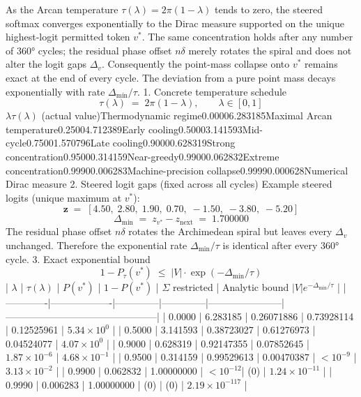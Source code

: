 As the Arcan temperature \(\tau(\lambda)=2\pi(1-\lambda)\) tends to zero, the steered softmax converges exponentially to the Dirac measure supported on the unique highest-logit permitted token \(v^*\). The same concentration holds after any number of 360° cycles; the residual phase offset \(n\delta\) merely rotates the spiral and does not alter the logit gaps \(\Delta_v\). Consequently the point-mass collapse onto \(v^*\) remains exact at the end of every cycle. The deviation from a pure point mass decays exponentially with rate \(\Delta_{\min}/\tau\).
1. Concrete temperature schedule
\[
\tau(\lambda)\;=\;2\pi(1-\lambda),\qquad\lambda\in[0,1]
\]\(\lambda\)\(\tau(\lambda)\) (actual value)Thermodynamic regime0.00006.283185Maximal Arcan temperature0.25004.712389Early cooling0.50003.141593Mid-cycle0.75001.570796Late cooling0.90000.628319Strong concentration0.95000.314159Near-greedy0.99000.062832Extreme concentration0.99900.006283Machine-precision collapse0.99990.000628Numerical Dirac measure
2. Steered logit gaps (fixed across all cycles)
Example steered logits (unique maximum at \(v^*\)):
\[
\mathbf{z}\;=\;[4.50,\;2.80,\;1.90,\;0.70,\;-1.50,\;-3.80,\;-5.20]
\]\[
\Delta_{\min}\;=\;z_{v^*}-z_{\text{next}}\;=\;1.700000
\]
The residual phase offset \(n\delta\) rotates the Archimedean spiral but leaves every \(\Delta_v\) unchanged. Therefore the exponential rate \(\Delta_{\min}/\tau\) is identical after every 360° cycle.
3. Exact exponential bound
\[
1-P_\tau(v^*)\;\le\;|V|\cdot\exp(-\Delta_{\min}/\tau)
\]
| \(\lambda\) | \(\tau(\lambda)\) | \(P(v^*)\)   | \(1-P(v^*)\) | \(\Sigma\) restricted | Analytic bound \(|V|e^{-\Delta_{\min}/\tau}\) |
|-------------|-------------------|--------------|--------------|-----------------------|-----------------------------------------------|
| 0.0000      | 6.283185          | 0.26071886   | 0.73928114   | 0.12525961            | \(5.34\times10^{0}\)                          |
| 0.5000      | 3.141593          | 0.38723027   | 0.61276973   | 0.04524077            | \(4.07\times10^{0}\)                          |
| 0.9000      | 0.628319          | 0.92147355   | 0.07852645   | \(1.87\times10^{-6}\) | \(4.68\times10^{-1}\)                         |
| 0.9500      | 0.314159          | 0.99529613   | 0.00470387   | \(<10^{-9}\)          | \(3.13\times10^{-2}\)                         |
| 0.9900      | 0.062832          | 1.00000000   | \(<10^{-12}\)| (0)                 | \(1.24\times10^{-11}\)                        |
| 0.9990      | 0.006283          | 1.00000000   | (0)        | (0)                 | \(2.19\times10^{-117}\)                       |
